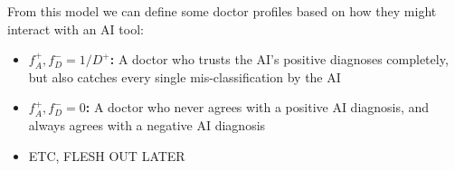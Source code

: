 \documentclass[manuscript,screen,review]{acmart}
\begin{document}














From this model we can define some doctor profiles based on how they might interact with an AI tool:

\begin{itemize}
    \item \textbf{$f^+_A, f^-_D = 1/D^+$:}  A doctor who trusts the AI's positive diagnoses completely, but also catches every single mis-classification by the AI
    \item \textbf{$f^+_A, f^-_D = 0$:}      A doctor who never agrees with a positive AI diagnosis, and always agrees with a negative AI diagnosis
    \item ETC, FLESH OUT LATER
\end{itemize}
\end{document}
